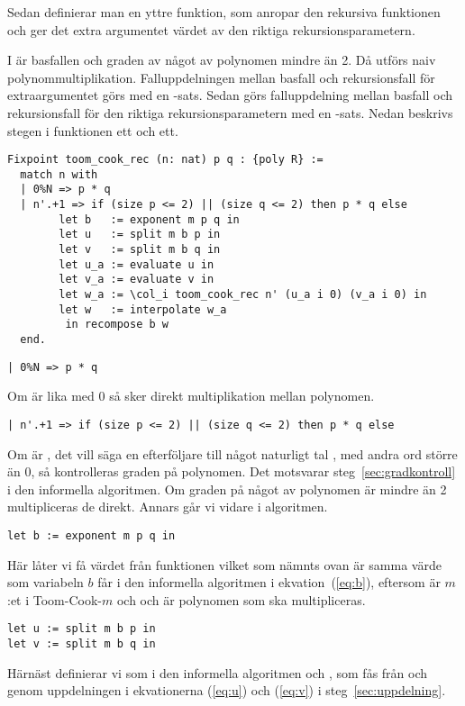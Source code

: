 Sedan definierar man en yttre funktion, som anropar den rekursiva funktionen och
ger det extra argumentet värdet av den riktiga rekursionsparametern.

I  är basfallen  och graden av något av polynomen
mindre än 2. Då utförs naiv polynommultiplikation. Falluppdelningen mellan
basfall och rekursionsfall för extraargumentet  görs med en
-sats. Sedan görs falluppdelning mellan basfall och rekursionsfall för
den riktiga rekursionsparametern med en -sats. Nedan
beskrivs stegen i funktionen ett och ett.

\begin{lstlisting}
Fixpoint toom_cook_rec (n: nat) p q : {poly R} :=
  match n with
  | 0%N => p * q
  | n'.+1 => if (size p <= 2) || (size q <= 2) then p * q else
        let b   := exponent m p q in
        let u   := split m b p in
        let v   := split m b q in
        let u_a := evaluate u in
        let v_a := evaluate v in
        let w_a := \col_i toom_cook_rec n' (u_a i 0) (v_a i 0) in
        let w   := interpolate w_a
         in recompose b w
  end.
\end{lstlisting}

\begin{lstlisting}
| 0%N => p * q
\end{lstlisting}
Om  är lika med 0 så sker direkt multiplikation mellan polynomen.

\begin{lstlisting}
| n'.+1 => if (size p <= 2) || (size q <= 2) then p * q else
\end{lstlisting}
Om  är , det vill säga en efterföljare till något naturligt tal
, med andra ord större än 0, så kontrolleras graden på polynomen. Det
motsvarar steg~\ref{sec:gradkontroll} i den informella algoritmen. Om graden på
något av polynomen är mindre än 2 multipliceras de direkt. Annars går vi vidare
i algoritmen.
\begin{lstlisting}
let b := exponent m p q in
\end{lstlisting}
Här låter vi  få värdet från funktionen  vilket som nämnts
ovan är samma värde som variabeln $b$ får i den informella algoritmen i
ekvation~(\ref{eq:b}), eftersom  är $m$:et i Toom-Cook-$m$ och  och
 är polynomen som ska multipliceras.
\begin{lstlisting}
let u := split m b p in
let v := split m b q in
\end{lstlisting}
Härnäst definierar vi som i den informella algoritmen  och , som fås
från  och  genom uppdelningen i ekvationerna (\ref{eq:u}) och
(\ref{eq:v}) i steg~\ref{sec:uppdelning}.

